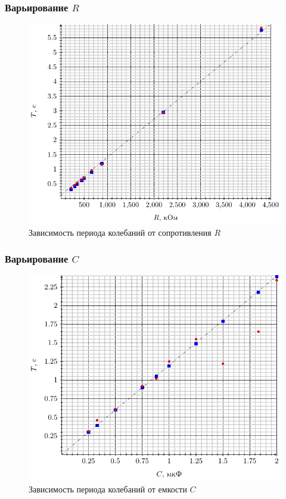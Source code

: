\subsubsection{Варьирование $R$}

\begin{figure}[H]
	\centering
	\includegraphics[width=\textwidth]{T_R}
	\caption{Зависимость периода колебаний от сопротивления $R$}
	\label{fig:figr}
\end{figure}
\subsubsection{Варьирование $C$}

\begin{figure}[H]
	\centering
	\includegraphics[width=\textwidth]{T_C}
	\caption{Зависимость периода колебаний от емкости $C$}
	\label{fig:figc}
\end{figure} 
